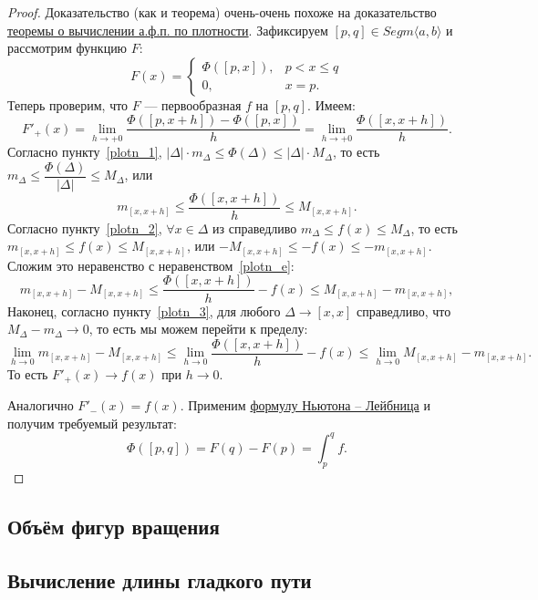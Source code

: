 \begin{proof}
	Доказательство (как и теорема) очень-очень похоже на доказательство \hyperlink{afp}{теоремы о вычислении а.ф.п. по плотности}. Зафиксируем \([p, q] \in Segm \langle a, b \rangle\) и рассмотрим функцию \(F\): \[
	F(x) =
	\begin{cases}
		\Phi([p, x]), & p < x \leqslant q \\
		0,			  & x = p.
	\end{cases}
	\]
	Теперь проверим, что \(F\) --- первообразная \(f\) на \([p, q]\). Имеем: \[
	F'_+(x) = \lim_{h \to +0} \frac{\Phi([p, x + h]) - \Phi([p, x])}{h} = \lim_{h \to +0} \frac{\Phi([x, x + h])}{h}.
	\]
	Согласно пункту~\ref{plotn_1}, \(|\Delta| \cdot m_\Delta \leqslant \Phi(\Delta) \leqslant |\Delta| \cdot M_\Delta\), то есть \(m_\Delta \leqslant \dfrac{\Phi(\Delta)}{|\Delta|} \leqslant M_\Delta\), или
	\begin{equation} \label{plotn_e}
		m_{[x, x + h]} \leqslant \frac{\Phi([x, x + h])}{h} \leqslant M_{[x, x + h]}.
	\end{equation}
	Согласно пункту~\ref{plotn_2}, \(\forall x \in \Delta\) из справедливо \(m_\Delta \leqslant f(x) \leqslant M_\Delta\), то есть \(m_{[x, x + h]} \leqslant f(x) \leqslant M_{[x, x + h]}\), или \(-M_{[x, x + h]} \leqslant -f(x) \leqslant -m_{[x, x + h]}\). Сложим это неравенство с неравенством~\eqref{plotn_e}: \[
	m_{[x, x + h]} - M_{[x, x + h]} \leqslant \frac{\Phi([x, x + h])}{h} - f(x) \leqslant M_{[x, x + h]} - m_{[x, x + h]},
	\]
	Наконец, согласно пункту~\ref{plotn_3}, для любого \(\Delta \to [x, x]\) справедливо, что \(M_\Delta - m_\Delta \to 0\), то есть мы можем перейти к пределу: \[
	\lim_{h \to 0} m_{[x, x + h]} - M_{[x, x + h]} \leqslant \lim_{h \to 0} \frac{\Phi([x, x + h])}{h} - f(x) \leqslant \lim_{h \to 0} M_{[x, x + h]} - m_{[x, x + h]}.
	\]
	То есть \(F'_+(x) \to  f(x)\) при \(h \to 0\).
	
	Аналогично \(F'_-(x) = f(x)\). Применим \hyperlink{t9}{формулу Ньютона -- Лейбница} и получим требуемый результат: \[
	\Phi([p, q]) = F(q) - F(p) = \int_p^q f.
	\]
\end{proof}

\subsection{\color{red} Объём фигур вращения}

\subsection{Вычисление длины гладкого пути}

